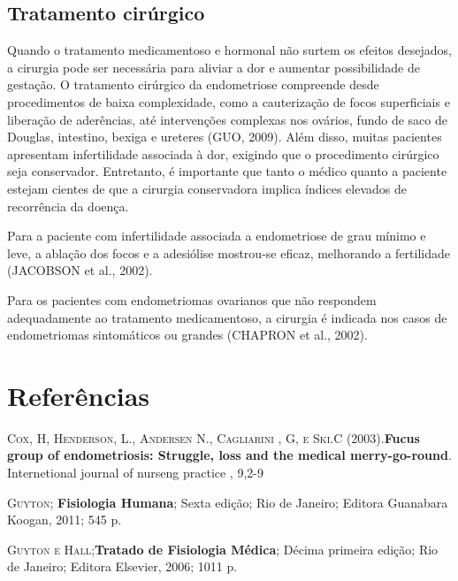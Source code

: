 \documentclass[12pt]{article} %
\begin{document}
\subsection{Tratamento cirúrgico}

Quando o tratamento medicamentoso e hormonal não surtem os efeitos
desejados, a cirurgia pode ser necessária para aliviar a dor e
aumentar possibilidade de gestação.  O tratamento cirúrgico da
endometriose compreende desde procedimentos de baixa complexidade,
como a cauterização de focos superficiais e liberação de aderências, até
intervenções complexas nos ovários, fundo de saco de Douglas,
intestino, bexiga e ureteres (GUO, 2009). Além disso, muitas pacientes
apresentam infertilidade associada à dor, exigindo que o procedimento
cirúrgico seja conservador. Entretanto, é importante que tanto o
médico quanto a paciente estejam cientes de que a cirurgia
conservadora implica índices elevados de recorrência da doença. %

Para a paciente com infertilidade associada a endometriose de grau
mínimo e leve, a ablação dos focos e a adesiólise mostrou-se eficaz,
melhorando a fertilidade (JACOBSON et al., 2002).

Para os pacientes com endometriomas ovarianos que não respondem
adequadamente ao tratamento medicamentoso, a cirurgia é indicada nos
casos de endometriomas sintomáticos ou grandes (CHAPRON et al., 2002).


\section{Referências} 
\setlength{\parindent}{0pt}

\textsc{Cox, H, Henderson, L., Andersen  N., Cagliarini , G, e Ski.C}
(2003).\textbf{Fucus group of endometriosis: Struggle, loss and the medical merry-go-round}. Internetional journal of nurseng practice , 9,2-9

\vspace{0,5cm}

\textsc{Guyton}; \textbf{ Fisiologia Humana}; Sexta edição; Rio de Janeiro; Editora Guanabara Koogan, 2011; 545 p.

\vspace{0,5cm}

\textsc{Guyton e Hall};\textbf{Tratado de Fisiologia Médica}; Décima primeira edição; Rio de Janeiro; Editora Elsevier, 2006; 1011 p.

\vspace{0,5cm}
\end{document}
